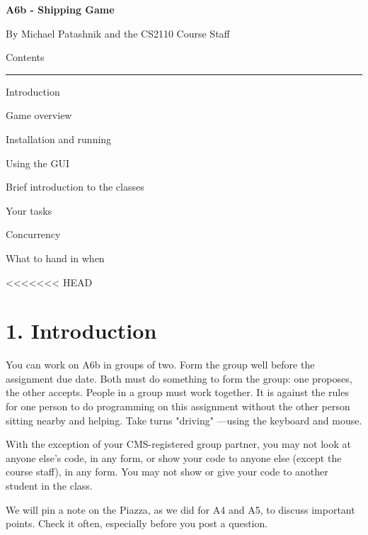 \documentclass[11pt]{article}
\begin{document}
\lstset{language=Java}
\begin{center}
\begin{HUGE}{\bf A6b - Shipping Game}\\ \end{HUGE}
\vspace{3mm}
\begin{LARGE} By Michael Patashnik and the CS2110 Course Staff\\ \end{LARGE}
\vspace{7mm}
\begin{LARGE} Contents\\ \end{LARGE}
\noindent\rule{8cm}{0.4pt}
\begin{enumerate} \begin{large}
\item Introduction\item Game overview
\item Installation and running
\item Using the GUI
\item Brief introduction to the classes
\item Your tasks
\item Concurrency
\item What to hand in when
\end{large}\end{enumerate}
\end{center}
<<<<<<< HEAD


\section{1. Introduction}
You can work on A6b in groups of two. Form the group well before the assignment due date. Both must do something to form the group:
one proposes, the other accepts.
People in a group must work together. It is against the rules for one person to do programming on this assignment
without the other person sitting nearby and helping. Take turns "driving" ---using the keyboard and mouse.

With the exception of your CMS-registered group partner, you may not look at anyone else's code, in any form,
or show your code to anyone else (except the course staff), in any form. You may not show or give your code to another
student in the class.

We will pin a note on the Piazza, as we did for A4 and A5, to discuss important points. Check it often, especially before you post a question.
\end{document}
